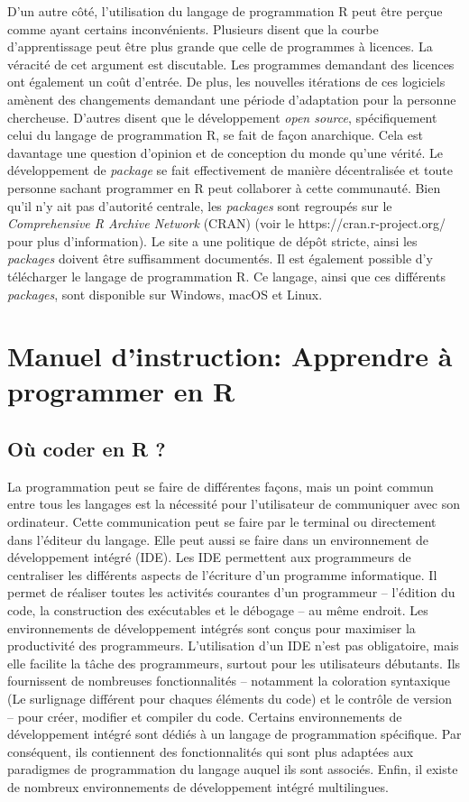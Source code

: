 \documentclass[
  letterpaper,
  DIV=11,
  numbers=noendperiod]{scrreprt}
\begin{document}
D'un autre côté, l'utilisation du langage de programmation R peut être
perçue comme ayant certains inconvénients. Plusieurs disent que la
courbe d'apprentissage peut être plus grande que celle de programmes à
licences. La véracité de cet argument est discutable. Les programmes
demandant des licences ont également un coût d'entrée. De plus, les
nouvelles itérations de ces logiciels amènent des changements demandant
une période d'adaptation pour la personne chercheuse. D'autres disent
que le développement \emph{open source}, spécifiquement celui du langage
de programmation R, se fait de façon anarchique. Cela est davantage une
question d'opinion et de conception du monde qu'une vérité. Le
développement de \emph{package} se fait effectivement de manière
décentralisée et toute personne sachant programmer en R peut collaborer
à cette communauté. Bien qu'il n'y ait pas d'autorité centrale, les
\emph{packages} sont regroupés sur le \emph{Comprehensive R Archive
Network} (CRAN) (voir le https://cran.r-project.org/ pour plus
d'information). Le site a une politique de dépôt stricte, ainsi les
\emph{packages} doivent être suffisamment documentés. Il est également
possible d'y télécharger le langage de programmation R. Ce langage,
ainsi que ces différents \emph{packages}, sont disponible sur Windows,
macOS et Linux.

\section{Manuel d'instruction: Apprendre à programmer en
R}\label{manuel-dinstruction-apprendre-uxe0-programmer-en-r}

\subsection{Où coder en R ?}\label{ouxf9-coder-en-r}

La programmation peut se faire de différentes façons, mais un point
commun entre tous les langages est la nécessité pour l'utilisateur de
communiquer avec son ordinateur. Cette communication peut se faire par
le terminal ou directement dans l'éditeur du langage. Elle peut aussi se
faire dans un environnement de développement intégré (IDE). Les IDE
permettent aux programmeurs de centraliser les différents aspects de
l'écriture d'un programme informatique. Il permet de réaliser toutes les
activités courantes d'un programmeur -- l'édition du code, la
construction des exécutables et le débogage -- au même endroit. Les
environnements de développement intégrés sont conçus pour maximiser la
productivité des programmeurs. L'utilisation d'un IDE n'est pas
obligatoire, mais elle facilite la tâche des programmeurs, surtout pour
les utilisateurs débutants. Ils fournissent de nombreuses
fonctionnalités -- notamment la coloration syntaxique (Le surlignage
différent pour chaques éléments du code) et le contrôle de version --
pour créer, modifier et compiler du code. Certains environnements de
développement intégré sont dédiés à un langage de programmation
spécifique. Par conséquent, ils contiennent des fonctionnalités qui sont
plus adaptées aux paradigmes de programmation du langage auquel ils sont
associés. Enfin, il existe de nombreux environnements de développement
intégré multilingues.
\end{document}
